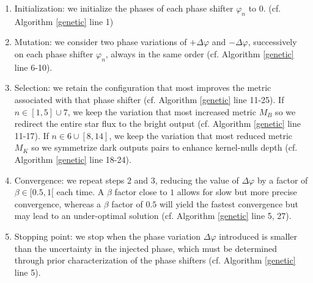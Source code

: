 \documentclass{aa}
\begin{document}
            \begin{enumerate}
                \item Initialization: we initialize the phases of each phase shifter $\varphi_n$ to 0.  (cf. Algorithm \ref{genetic} line 1)
                \item Mutation: we consider two phase variations of $+ \Delta \varphi$ and $- \Delta \varphi$, successively on each phase shifter $\varphi_n$, always in the same order  (cf. Algorithm \ref{genetic} line 6-10).
                \item Selection: we retain the configuration that most improves the metric associated with that phase shifter (cf. Algorithm \ref{genetic} line 11-25).
                    \subitem If $n \in [1, 5] \cup 7$, we keep the variation that most increased metric $M_B$ so we redirect the entire star flux to the bright output  (cf. Algorithm \ref{genetic} line 11-17).
                    \subitem If $n \in 6 \cup [8, 14]$, we keep the variation that most reduced metric $M_K$ so we symmetrize dark outputs pairs to enhance kernel-nulls depth  (cf. Algorithm \ref{genetic} line 18-24).
                \item Convergence: we repeat steps 2 and 3, reducing the value of $\Delta \varphi$ by a factor of $\beta \in [0.5,1[$ each time. A $\beta$ factor close to $1$ allows for slow but more precise convergence, whereas a $\beta$ factor of $0.5$ will yield the fastest convergence but may lead to an under-optimal solution  (cf. Algorithm \ref{genetic} line 5, 27).
                \item Stopping point: we stop when the phase variation $\Delta \varphi$ introduced is smaller than the uncertainty in the injected phase, which must be determined through prior characterization of the phase shifters  (cf. Algorithm \ref{genetic} line 5).
            \end{enumerate}
\end{document}
